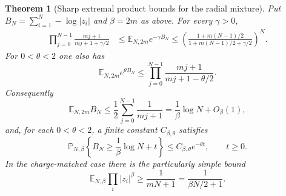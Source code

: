 \documentclass[11pt,a4paper]{article}
\numberwithin{equation}{section}
\newtheorem{theorem}{Theorem}[section]
\theoremstyle{definition}
\theoremstyle{remark}
\begin{document}
\begin{theorem}[Sharp extremal product bounds for the radial mixture]
\label{thm:even-beta-radial-products}
Put $B_N=\sum_{i=1}^N-\log|z_i|$ and $\beta=2m$ as above.
For every $\gamma>0$,
\begin{align}
 \prod_{j=0}^{N-1}\frac{mj+1}{mj+1+\gamma/2}
 &\leq \mathbb E_{N,2m}e^{-\gamma B_N}
 \leq
 \left(\frac{1+m(N-1)/2}
 {1+m(N-1)/2+\gamma/2}\right)^N.
 \label{eq:even-beta-negative-depth-mgf}
\end{align}
For $0<\theta<2$ one also has
\begin{equation}
 \mathbb E_{N,2m}e^{\theta B_N}
 \leq\prod_{j=0}^{N-1}\frac{mj+1}{mj+1-\theta/2}.
 \label{eq:even-beta-positive-depth-mgf}
\end{equation}
Consequently
\begin{equation}
 \mathbb E_{N,2m}B_N
 \leq\frac12\sum_{j=0}^{N-1}\frac1{mj+1}
 =\frac1\beta\log N+O_\beta(1),
 \label{eq:even-beta-mean-depth}
\end{equation}
and, for each $0<\theta<2$, a finite constant $C_{\beta,\theta}$ satisfies
\begin{equation}
 \mathbb P_{N,\beta}\left\{B_N\geq\frac1\beta\log N+t\right\}
 \leq C_{\beta,\theta}e^{-\theta t},\qquad t\geq0.
 \label{eq:even-beta-depth-upper-tail}
\end{equation}
In the charge-matched case there is the particularly simple bound
\begin{equation}
 \mathbb E_{N,\beta}\prod_i|z_i|^\beta
 \geq\frac1{mN+1}=\frac1{\beta N/2+1}.
 \label{eq:even-beta-charge-matched-bound}
\end{equation}
\end{theorem}
\end{document}
